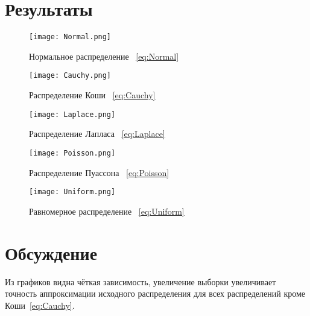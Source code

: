 \documentclass[12pt,a4paper]{scrartcl}
\begin{document}
\section{Результаты}
\begin{figure}[H]
  \centering
  \texttt{[image: Normal.png]}
  \caption{Нормальное распределение ~\eqref{eq:Normal}}
 
\end{figure}
\begin{figure}[H]
  \centering
  \texttt{[image: Cauchy.png]}
  \caption{Распределение Коши ~\eqref{eq:Cauchy}}
\end{figure}
\begin{figure}[H]
\centering
  \texttt{[image: Laplace.png]}
  \caption{Распределение Лапласа ~\eqref{eq:Laplace}}
\end{figure}
\begin{figure}[H]
  \centering
  \texttt{[image: Poisson.png]}
  \caption{Распределение Пуассона ~\eqref{eq:Poisson}}
\end{figure}
\begin{figure}[H]
  \centering
  \texttt{[image: Uniform.png]}
  \caption{Равномерное распределение ~\eqref{eq:Uniform}}
\end{figure}

\section{Обсуждение}
Из графиков видна чёткая зависимость, увеличение выборки увеличивает точность аппроксимации исходного распределения для всех распределений кроме Коши~\eqref{eq:Cauchy}.
\end{document}
